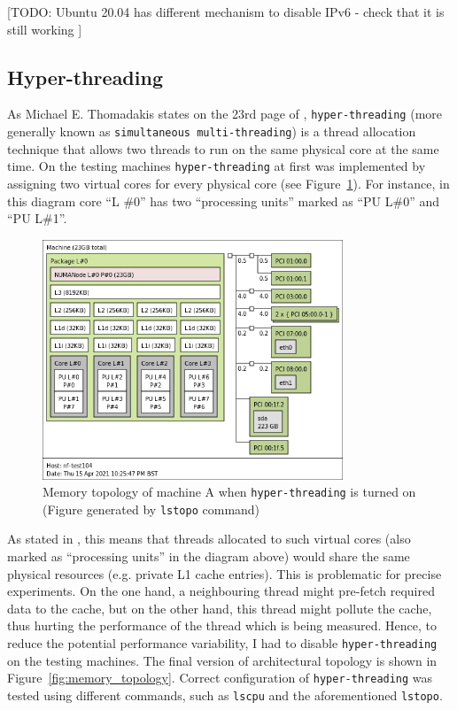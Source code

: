 \documentclass[12pt,a4paper,twoside,openright]{report}
\begin{document}
[TODO: Ubuntu 20.04 has different mechanism  to disable IPv6 - check that it is still working ]

\subsection{Hyper-threading}\label{Hyperthreading_Subsection_Tag}

As Michael E. Thomadakis states on the 23rd page of \cite{hyperthreading_book}, \texttt{hyper-threading} (more generally known as \texttt{simultaneous multi-threading}) is a thread allocation technique that allows two threads to run on the same physical core at the same time.
On the testing machines \texttt{hyper-threading} at first was implemented by assigning two virtual cores for every physical core (see Figure~\ref{fig:topology_with_hyperthreading}).
For instance, in this diagram core \enquote{L \#0} has two \enquote{processing units} marked as \enquote{PU L\#0} and \enquote{PU L\#1}.

    \begin{figure}[H]
    \centering
    \includegraphics[width=0.8\textwidth]{figs/topology_with_hyperthreading.png}
    \caption{Memory topology of machine A when \texttt{hyper-threading} is turned on (Figure generated by \texttt{lstopo} command)}
    \label{fig:topology_with_hyperthreading}
    \end{figure}

As stated in \cite{hyperthreading_book}, this means that threads allocated to such virtual cores (also marked as \enquote{processing units} in the diagram above) would share the same physical resources (e.g. private L1 cache entries).
This is problematic for precise experiments.
On the one hand, a neighbouring thread might pre-fetch required data to the cache, but on the other hand, this thread might pollute the cache, thus hurting the performance of the thread which is being measured.
Hence, to reduce the potential performance variability, I had to disable \texttt{hyper-threading} on the testing machines.
The final version of architectural topology is shown in Figure~\ref{fig:memory_topology}. 
Correct configuration of \texttt{hyper-threading} was tested using different commands, such as \texttt{lscpu} and the aforementioned \texttt{lstopo}. 
\end{document}
